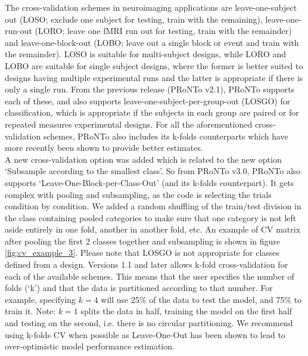 The cross-validation schemes in neuroimaging applications are leave-one-subject out (LOSO; exclude one subject for testing, train with the remaining), leave-one-run-out (LORO; leave one fMRI run out for testing, train with the remainder) and leave-one-block-out (LOBO; leave out a single block or event and train with the remainder). LOSO is suitable for multi-subject designs, while LORO and LOBO are suitable for single subject designs, where the former is better suited to designs having multiple experimental runs and the latter is appropriate if there is only a single run. From the previous release (PRoNTo v2.1), PRoNTo supports each of these, and also supports leave-one-subject-per-group-out (LOSGO) for classification, which is appropriate if the subjects in each group are paired or for repeated measures experimental designs. For all the aforementioned cross-validation schemes, PRoNTo also includes its k-folds counterparts which have more recently been shown to provide better estimates.
\\

A new cross-validation option was added which is related to the new option `Subsample according to the smallest class'. So from PRoNTo v3.0, PRoNTo also supports `Leave-One-Block-per-Class-Out' (and its k-folds counterpart). It gets complex with pooling and subsampling, as the code is selecting the trials condition by condition. We added a random shuffling of the train/test division in the class containing pooled categories to make sure that one category is not left aside entirely in one fold, another in another fold, etc. %
An example of CV matrix after pooling the first 2 classes together and subsampling is shown in figure \ref{fig:cv_example_3}.
Please note that LOSGO is not appropriate for classes defined from a design. Versions 1.1 and later allows k-fold cross-validation for each of the available schemes. This means that the user specifies the number of folds (`k') and that the data is partitioned according to that number. For example, specifying $k=4$ will use 25\% of the data to test the model, and 75\% to train it. Note: $k=1$ splits the data in half, training the model on the first half and testing on the second, i.e. there is no circular partitioning. We recommend using k-folds CV when possible as Leave-One-Out has been shown to lead to over-optimistic model performance estimation.
\\

